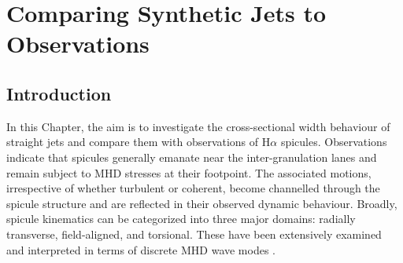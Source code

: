 \chapter{Comparing Synthetic Jets to Observations}
\label{cap:obs}
\let\thefootnote\relax{}
\section{Introduction}
In this Chapter, the aim is to investigate the cross-sectional width behaviour of straight jets and compare them with observations of H$\alpha$ spicules. Observations indicate that spicules generally emanate near the inter-granulation lanes and remain subject to MHD stresses at their footpoint. The associated motions, irrespective of whether turbulent or coherent, become channelled through the spicule structure and are reflected in their observed dynamic behaviour. Broadly, spicule kinematics can be categorized into three major domains: radially transverse, field-aligned, and torsional. These have been extensively examined and interpreted in terms of discrete MHD wave modes \citep[see review:][]{Zaqarashvili_2009SSRv}. \np  
%
